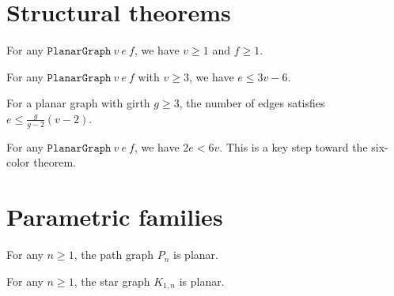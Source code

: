 \section{Structural theorems}

\begin{proposition}\label{prop:positivity}
\leanok
{}
For any $\texttt{PlanarGraph}\ v\ e\ f$, we have $v \geq 1$ and $f \geq 1$.
\end{proposition}

\begin{theorem}\label{thm:edge_bound}
\leanok
{}
For any $\texttt{PlanarGraph}\ v\ e\ f$ with $v \geq 3$, we have $e \leq 3v - 6$.
\end{theorem}

\begin{theorem}\label{thm:girth_bound}
\leanok
{}
For a planar graph with girth $g \geq 3$, the number of edges satisfies
$e \leq \frac{g}{g-2}(v-2)$.
\end{theorem}

\begin{theorem}\label{thm:six_color}
\leanok
{}
For any $\texttt{PlanarGraph}\ v\ e\ f$, we have $2e < 6v$.
This is a key step toward the six-color theorem.
\end{theorem}

\section{Parametric families}

\begin{theorem}\label{thm:path}
\leanok
{}
For any $n \geq 1$, the path graph $P_n$ is planar.
\end{theorem}

\begin{theorem}\label{thm:star}
\leanok
{}
For any $n \geq 1$, the star graph $K_{1,n}$ is planar.
\end{theorem}

